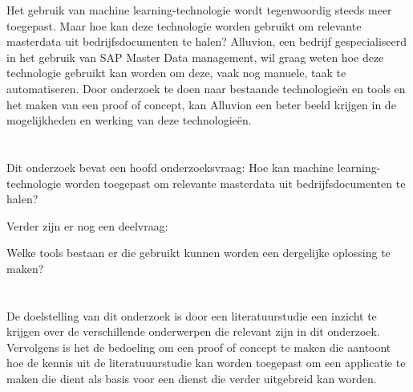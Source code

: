 Het gebruik van machine learning-technologie wordt tegenwoordig steeds meer toegepast. Maar hoe kan deze technologie worden gebruikt om relevante masterdata uit bedrijfsdocumenten te halen? Alluvion, een bedrijf gespecialiseerd in het gebruik van SAP Master Data management, wil graag weten hoe deze technologie gebruikt kan worden om deze, vaak nog manuele, taak te automatiseren. Door onderzoek te doen naar bestaande technologieën en tools en het maken van een proof of concept, kan Alluvion een beter beeld krijgen in de mogelijkheden en werking van deze technologieën.
\section{}%
\label{sec:onderzoeksvraag}
Dit onderzoek bevat een hoofd onderzoeksvraag:
Hoe kan machine learning-technologie worden toegepast om relevante masterdata uit bedrijfsdocumenten te halen?

Verder zijn er nog een deelvraag:

Welke tools bestaan er die gebruikt kunnen worden een dergelijke oplossing te maken?

\section{}%
\label{sec:onderzoeksdoelstelling}

De doelstelling van dit onderzoek is door een literatuurstudie een inzicht te krijgen over de verschillende onderwerpen die relevant zijn in dit onderzoek. Vervolgens is het de bedoeling om een proof of concept te maken die aantoont hoe de kennis uit de literatuuurstudie kan worden toegepast om een applicatie te maken die dient als basis voor een dienst die verder uitgebreid kan worden.  

